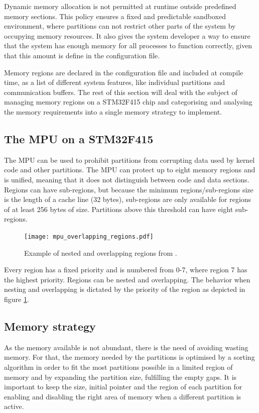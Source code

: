 Dynamic memory allocation is not permitted at runtime
outside predefined memory sections.
This policy ensures a fixed and predictable sandboxed environment, where partitions can not restrict other parts of the system by occupying memory resources.
It also gives the system developer a way to ensure that the system has enough memory for all processes to function correctly, given that this amount is define in the configuration file.


Memory regions are declared in the configuration file and included at compile time,
as a list of different system features, like individual partitions and communication buffers.
The rest of this section will deal with the subject of managing memory regions on a
STM32F415 chip and categorising and analysing the memory requirements into a single
memory strategy to implement.


\subsection{The MPU on a STM32F415}
\label{ssec:design_mpu}
The MPU can be used to prohibit partitions from corrupting data used by kernel code and other partitions.
The MPU can protect up to eight memory regions and is unified, meaning that it does not distinguish between code and data sections.
Regions can have sub-regions, but because the minimum regions/sub-regions size is the length of a cache line (32 bytes),
sub-regions are only available for regions of at least 256 bytes of size.
Partitions above this threshold can have eight sub-regions.

\begin{figure}[H]
	\begin{center}
		\texttt{[image: mpu\_overlapping\_regions.pdf]}
		\caption{Example of nested and overlapping regions from \cite{stm32_mpu}.}
		\label{fig:stm32_mpu}
	\end{center}
\end{figure}

Every region has a fixed priority and is numbered from 0-7, where region 7 has the highest priority.
Regions can be nested and overlapping.
The behavior when nesting and overlapping is dictated by the priority of the region as depicted in figure \ref{fig:stm32_mpu}.


\subsection{Memory strategy}
As the memory available is not abundant, there is the need of avoiding wasting memory.
For that, the memory needed by the partitions is optimised by a sorting algorithm in order to fit
the most partitions possible in a limited region of memory and by expanding the partition size,
fulfilling the empty gaps.
It is important to keep the size,
initial pointer and the region of each partition for enabling and disabling the right area of memory when a different partition is active.


